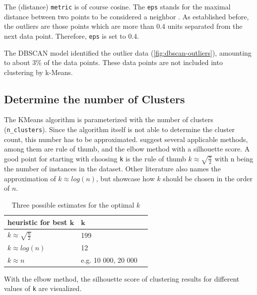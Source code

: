 The (distance) \lstinline|metric| is of course cosine. The \lstinline|eps| stands for the maximal distance between two points to be considered a neighbor \cite{SklearnClusterDBSCAN}. As established before, the outliers are those points which are more than 0.4 units separated from the next data point. Therefore, \lstinline|eps| is set to 0.4. 

The \ac{DBSCAN} model identified the outlier data (\ref{fig:dbscan-outliers}), amounting to about 3\% of the data points. These data points are not included into clustering by k-Means.

\subsection{Determine the number of Clusters}
The KMeans algorithm is parameterized with the number of clusters (\lstinline|n_clusters|). Since the algorithm itself is not able to determine the cluster count, this number has to be approximated.
\cite{kodinariyaReviewDeterminingCluster2013} suggest several applicable methods, among them are rule of thumb, and the elbow method with a silhouette score.
A good point for starting with choosing \lstinline|k| is the rule of thumb $k \approx \sqrt{\frac{n}{2}}$ with n being the number of instances in the dataset. Other literature also names the approximation of $k \approx log(n)$, but \cite{maierOptimalConstructionKnearest2009} showcase how $k$ should be chosen in the order of $n$. 

\begin{table}[!h]
	\centering
	\caption{Three possible estimates for the optimal $k$}
	\begin{tabular}{lll}
		\toprule
		\textbf{heuristic for best }$\mathbf{k}$                         & $\mathbf{k}$ &  \\
		\midrule
		$k \approx \sqrt{\frac{n}{2}}$ &  199 &  \\
		\midrule
		$k \approx log(n)$             & 12   &  \\
		\midrule
		$k \approx n$                  &  e.g. 10 000, 20 000& \\
		\bottomrule
		
	\end{tabular}

\label{table:heuristic-k}
\end{table}

With the elbow method, the silhouette score of clustering results for different values of \lstinline|k| are visualized. 

